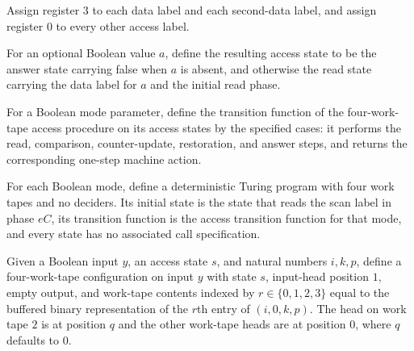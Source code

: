\begin{definition}
\label{Complexity.LogProg.accessReg}
\leanok
{}
Assign register $3$ to each data label and each second-data label, and assign register
$0$ to every other access label.
\end{definition}

\begin{definition}
\label{Complexity.LogProg.accessExit}
\leanok
{}
For an optional Boolean value $a$, define the resulting access state to be the answer
state carrying false when $a$ is absent, and otherwise the read state carrying the data
label for $a$ and the initial read phase.
\end{definition}

\begin{definition}
\label{Complexity.LogProg.accessTr}
\leanok
{}
For a Boolean mode parameter, define the transition function of the four-work-tape
access procedure on its access states by the specified cases: it performs the read,
comparison, counter-update, restoration, and answer steps, and returns the corresponding
one-step machine action.
\end{definition}

\begin{definition}
\label{Complexity.LogProg.accessProg}
\leanok
{}
For each Boolean mode, define a deterministic Turing program with four work tapes and no
deciders. Its initial state is the state that reads the scan label in phase $eC$, its
transition function is the access transition function for that mode, and every state has
no associated call specification.
\end{definition}

\begin{definition}
\label{Complexity.LogProg.accessCfg}
\leanok
{}
Given a Boolean input $y$, an access state $s$, and natural numbers $i,k,p$, define a
four-work-tape configuration on input $y$ with state $s$, input-head position $1$, empty
output, and work-tape contents indexed by $r\in\{0,1,2,3\}$ equal to the buffered binary
representation of the $r$th entry of $(i,0,k,p)$. The head on work tape $2$ is at
position $q$ and the other work-tape heads are at position $0$, where $q$ defaults to
$0$.
\end{definition}

